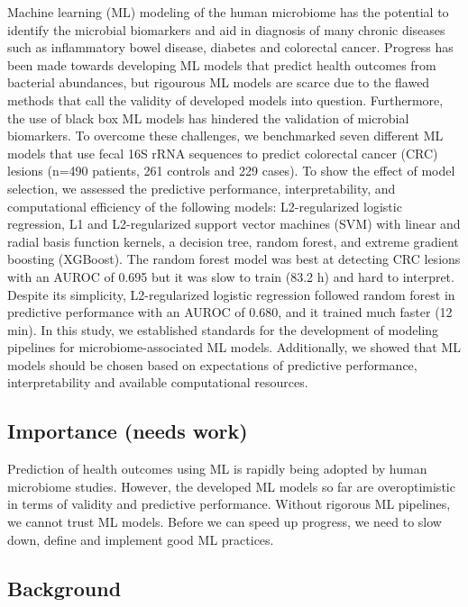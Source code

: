 \documentclass[11pt,]{article}
\begin{document}
Machine learning (ML) modeling of the human microbiome has the potential
to identify the microbial biomarkers and aid in diagnosis of many
chronic diseases such as inflammatory bowel disease, diabetes and
colorectal cancer. Progress has been made towards developing ML models
that predict health outcomes from bacterial abundances, but rigourous ML
models are scarce due to the flawed methods that call the validity of
developed models into question. Furthermore, the use of black box ML
models has hindered the validation of microbial biomarkers. To overcome
these challenges, we benchmarked seven different ML models that use
fecal 16S rRNA sequences to predict colorectal cancer (CRC) lesions
(n=490 patients, 261 controls and 229 cases). To show the effect of
model selection, we assessed the predictive performance,
interpretability, and computational efficiency of the following models:
L2-regularized logistic regression, L1 and L2-regularized support vector
machines (SVM) with linear and radial basis function kernels, a decision
tree, random forest, and extreme gradient boosting (XGBoost). The random
forest model was best at detecting CRC lesions with an AUROC of 0.695
but it was slow to train (83.2 h) and hard to interpret. Despite its
simplicity, L2-regularized logistic regression followed random forest in
predictive performance with an AUROC of 0.680, and it trained much
faster (12 min). In this study, we established standards for the
development of modeling pipelines for microbiome-associated ML models.
Additionally, we showed that ML models should be chosen based on
expectations of predictive performance, interpretability and available
computational resources.

\newpage

\subsection{Importance (needs work)}\label{importance-needs-work}

Prediction of health outcomes using ML is rapidly being adopted by human
microbiome studies. However, the developed ML models so far are
overoptimistic in terms of validity and predictive performance. Without
rigorous ML pipelines, we cannot trust ML models. Before we can speed up
progress, we need to slow down, define and implement good ML practices.
\newpage

\subsection{Background}\label{background}
\end{document}
